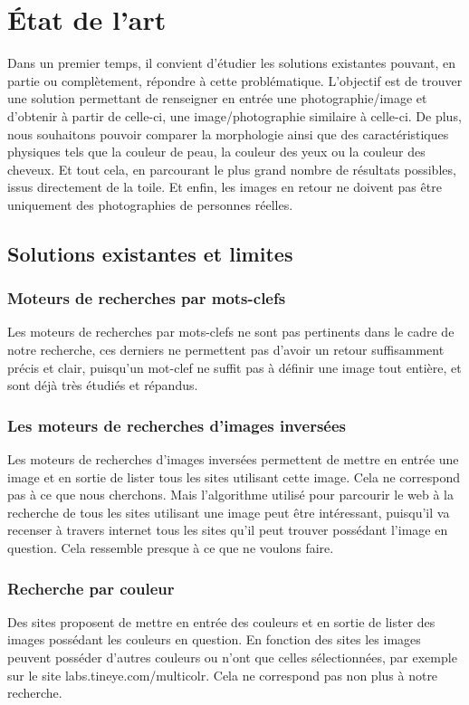 \documentclass[a4paper,12pt]{article}
\begin{document}
\section{État de l'art}
Dans un premier temps, il convient d'étudier les solutions existantes pouvant, en partie ou complètement, répondre à cette problématique. 
L'objectif est de trouver une solution permettant de renseigner en entrée une photographie/image et d'obtenir à partir de celle-ci, une image/photographie similaire à celle-ci. De plus, nous souhaitons pouvoir comparer la morphologie ainsi que des caractéristiques physiques tels que la couleur de peau, la couleur des yeux ou la couleur des cheveux. Et tout cela, en parcourant le plus grand nombre de résultats possibles, issus directement de la toile. Et enfin, les images en retour ne doivent pas être uniquement des photographies de personnes réelles.

\subsection{Solutions existantes et limites}
\subsubsection{Moteurs de recherches par mots-clefs}
Les moteurs de recherches par mots-clefs ne sont pas pertinents dans le cadre de notre recherche, ces derniers ne permettent pas d'avoir un retour suffisamment précis et clair, puisqu'un mot-clef ne suffit pas à définir une image tout entière, et sont déjà très étudiés et répandus. 
\subsubsection{Les moteurs de recherches d'images inversées}
Les moteurs de recherches d'images inversées permettent de mettre en entrée une image et en sortie de lister tous les sites utilisant cette image. Cela ne correspond pas à ce que nous cherchons. Mais l'algorithme utilisé pour parcourir le web à la recherche de tous les sites utilisant une image peut être intéressant, puisqu'il va recenser à travers internet tous les sites qu'il peut trouver possédant l'image en question. Cela ressemble presque à ce que ne voulons faire. 

\subsubsection{Recherche par couleur}
Des sites proposent de mettre en entrée des couleurs et en sortie de lister des images possédant les couleurs en question. En fonction des sites les images peuvent posséder d'autres couleurs ou n'ont que celles sélectionnées, par exemple sur le site labs.tineye.com/multicolr. Cela ne correspond pas non plus à notre recherche. 
\end{document}
